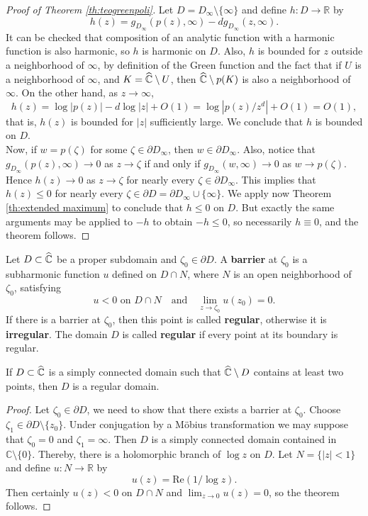 \begin{proof}[Proof of Theorem \ref{th:teogreenpoli}]
Let $D=D_\infty\setminus \{\infty\}$ and define $h:D \rightarrow \mathbb{R}$ by
$$h(z) = g_{D_\infty}(p(z),\infty)-dg_{D_\infty}(z,\infty).$$
It can be checked that composition of an analytic function with a harmonic function is also harmonic, so $h$ is harmonic on $D$. Also, $h$ is bounded for $z$ outside a neighborhood of $\infty$, by definition of the Green function and the fact that if $U$ is a neighborhood of $\infty$, and $K=\widehat{\mathbb{C}} \setminus U$, then $\widehat{\mathbb{C}} \setminus p(K)$ is also a neighborhood of $\infty$. On the other hand, as $z\rightarrow \infty$,
$$h(z) = \log|p(z)|-d\log |z|+O(1)=\log|p(z)/z^d|+O(1)=O(1),$$
that is, $h(z)$ is bounded for $|z|$ sufficiently large. We conclude that $h$ is bounded on $D$.\\

Now, if $w=p(\zeta)$ for some $\zeta\in \partial D_\infty$, then $w\in \partial D_\infty$. Also, notice that $g_{D_\infty}(p(z),\infty) \rightarrow 0$ as $z\rightarrow \zeta$ if and only if $g_{D_\infty}(w,\infty) \rightarrow 0$ as $w\rightarrow p(\zeta)$. Hence $h(z) \rightarrow 0$ as $z\rightarrow \zeta$ for nearly every $\zeta \in \partial D_\infty$. This implies that $h(z) \leq 0$ for nearly every $\zeta \in \partial D= \partial D_\infty \cup \{\infty\}$. We apply now Theorem \ref{th:extended maximum} to conclude that $h\leq 0$ on $D$. But exactly the same arguments may be applied to $-h$ to obtain $-h \leq 0$, so necessarily $h\equiv 0$, and the theorem follows.
\end{proof}

\begin{mydef}{}{}
Let $D\subset \widehat{\mathbb{C}}$ be a proper subdomain and $\zeta_0\in \partial D$. A {\bf barrier} at $\zeta_0$ is a subharmonic function $u$ defined on $D\cap N$, where $N$ is an open neighborhood of $\zeta_0$, satisfying
$$u<0 \text{ on } D\cap N \quad \text{and} \quad \lim_{z\rightarrow \zeta_0} u(z_0)=0.$$
If there is a barrier at $\zeta_0$, then this point is called {\bf regular}, otherwise it is {\bf irregular}. The domain $D$ is called {\bf regular} if every point at its boundary is regular. 
\end{mydef}

\begin{mytheo}{}{}
If $D\subset \widehat{\mathbb{C}}$ is a simply connected domain such that $\widehat{\mathbb{C}}\setminus D$ contains at least two points, then $D$ is a regular domain.
\end{mytheo}

\begin{proof}
Let $\zeta_0\in \partial D$, we need to show that there exists a barrier at $\zeta_0$. Choose $\zeta_1\in \partial D\setminus\{z_0\}$. Under conjugation by a Möbius transformation we may suppose that $\zeta_0=0$ and $\zeta_1=\infty$. Then $D$ is a simply connected domain contained in $\mathbb{C}\setminus\{0\}$. Thereby, there is a holomorphic branch of $\log z$ on $D$. Let $N=\{|z|<1\}$ and define $u:N\rightarrow \mathbb{R}$ by
$$u(z) = \text{Re}(1/\log z).$$
Then certainly $u(z)<0$ on $D\cap N$ and $\lim_{z\rightarrow 0} u(z)=0$, so the theorem follows.
\end{proof}

